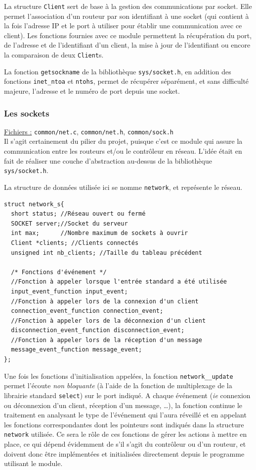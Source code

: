 \documentclass[a4paper,11pt]{article}
\begin{document}
La structure \texttt{Client} sert de base à la gestion des communications par socket. Elle permet l'association d'un routeur par son identifiant à une socket (qui contient à la fois l'adresse IP et le port à utiliser pour établir une communication avec ce client). Les fonctions fournies avec ce module permettent la récupération du port, de l'adresse et de l'identifiant d'un client, la mise à jour de l'identifiant ou encore la comparaison de deux \texttt{Client}s.

La fonction \texttt{getsockname} de la bibliothèque \texttt{sys/socket.h}, en addition des fonctions \texttt{inet\_ntoa} et \texttt{ntohs}, permet de récupérer séparément, et sans difficulté majeure, l'adresse et le numéro de port depuis une socket.

\subsubsection{Les sockets}

\underline{Fichiers :} \texttt{common/net.c}, \texttt{common/net.h}, \texttt{common/sock.h}\\

Il s'agit certainement du pilier du projet, puisque c'est ce module qui assure la communication entre les routeurs et/ou le contrôleur en réseau. L'idée était en fait de réaliser une couche d'abstraction au-dessus de la bibliothèque \texttt{sys/socket.h}.

La structure de données utilisée ici se nomme \texttt{network}, et représente le réseau.
\begin{lstlisting}
struct network_s{
  short status; //Réseau ouvert ou fermé
  SOCKET server;//Socket du serveur
  int max;      //Nombre maximum de sockets à ouvrir
  Client *clients; //Clients connectés
  unsigned int nb_clients; //Taille du tableau précédent

  /* Fonctions d'événement */
  //Fonction à appeler lorsque l'entrée standard a été utilisée
  input_event_function input_event;
  //Fonction à appeler lors de la connexion d'un client
  connection_event_function connection_event;
  //Fonction à appeler lors de la déconnexion d'un client
  disconnection_event_function disconnection_event;
  //Fonction à appeler lors de la réception d'un message
  message_event_function message_event;
};
\end{lstlisting}

Une fois les fonctions d'initialisation appelées, la fonction \texttt{network\_\_update} permet l'écoute \textit{non bloquante} (à l'aide de la fonction de multiplexage de la librairie standard \texttt{select}) sur le port indiqué. A chaque événement (\textit{ie} connexion ou déconnexion d'un client, réception d'un message, \dots), la fonction continue le traitement en analysant le type de l'événement qui l'aura réveillé et en appelant les fonctions correspondantes dont les pointeurs sont indiqués dans la structure \texttt{network} utilisée. Ce sera le rôle de ces fonctions de gérer les actions à mettre en place, ce qui dépend évidemment de s'il s'agit du contrôleur ou d'un routeur, et doivent donc être implémentées et initialisées directement depuis le programme utilisant le module.
\end{document}
